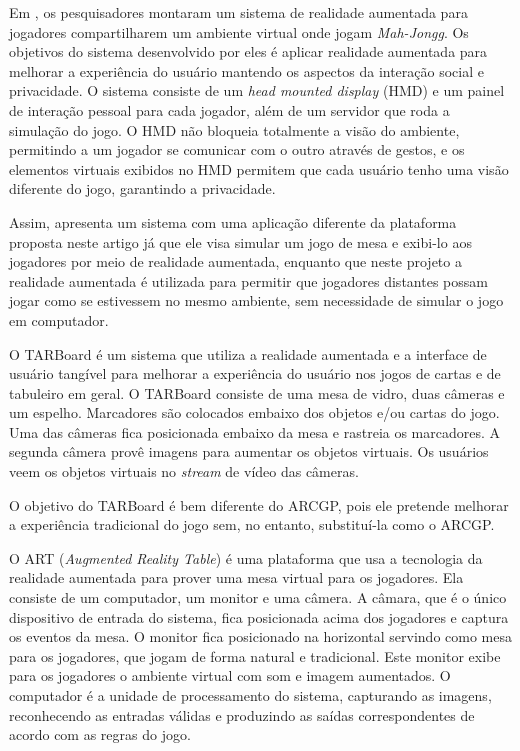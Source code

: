 \documentclass[conference]{IEEEtran}
\begin{document}
Em \cite{Szalavari:1998:CGA:293701.293740}, os pesquisadores montaram um sistema 
de realidade aumentada para jogadores compartilharem um ambiente virtual onde 
jogam \textit{Mah-Jongg}. Os objetivos do sistema desenvolvido por eles é 
aplicar realidade aumentada para melhorar a experiência do usuário mantendo os 
aspectos da interação social e privacidade. O sistema consiste de um 
\textit{head mounted display} (HMD) e um painel de interação pessoal para cada 
jogador, além de um servidor que roda a simulação do jogo. O HMD não bloqueia 
totalmente a visão do ambiente, permitindo a um jogador se comunicar com o outro 
através de gestos, e os elementos virtuais exibidos no HMD permitem que cada 
usuário tenho uma visão diferente do jogo, garantindo a privacidade.

Assim, \cite{Szalavari:1998:CGA:293701.293740} apresenta um sistema com uma 
aplicação diferente da plataforma proposta neste artigo já que ele visa simular 
um jogo de mesa e exibi-lo aos jogadores por meio de realidade aumentada, 
enquanto que neste projeto a realidade aumentada é utilizada para permitir que 
jogadores distantes possam jogar como se estivessem no mesmo ambiente, sem 
necessidade de simular o jogo em computador.

O TARBoard \cite{lee2005tarboard} é um sistema que utiliza a realidade aumentada 
e a interface de usuário tangível para melhorar a experiência do usuário nos 
jogos de cartas e de tabuleiro em geral. O TARBoard consiste de uma mesa de 
vidro, duas câmeras e um espelho. Marcadores são colocados embaixo dos objetos 
e/ou cartas do jogo. Uma das câmeras fica posicionada embaixo da mesa e rastreia 
os marcadores. A segunda câmera provê imagens para aumentar os objetos virtuais. 
Os usuários veem os objetos virtuais no \textit{stream} de vídeo das câmeras.

O objetivo do TARBoard é bem diferente do ARCGP, pois ele pretende melhorar a 
experiência tradicional do jogo sem, no entanto, substituí-la como o ARCGP.

O ART (\textit{Augmented Reality Table}) \cite{Lam:2006:AAR:1128923.1128987} é 
uma plataforma que usa a tecnologia da realidade aumentada para prover uma mesa 
virtual para os jogadores. Ela consiste de um computador, um monitor e uma 
câmera. A câmara, que é o único dispositivo de entrada do sistema, fica 
posicionada acima dos jogadores e captura os eventos da mesa. O monitor fica 
posicionado na horizontal servindo como mesa para os jogadores, que jogam de 
forma natural e tradicional. Este monitor exibe para os jogadores o ambiente 
virtual com som e imagem aumentados. O computador é a unidade de processamento 
do sistema, capturando as imagens, reconhecendo as entradas válidas e produzindo 
as saídas correspondentes de acordo com as regras do jogo.
\end{document}
